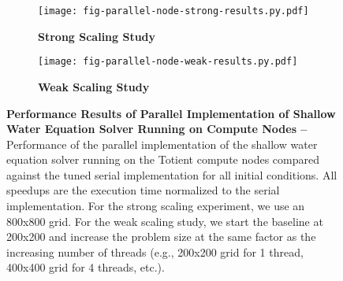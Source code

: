 
\begin{figure}[h]

  \begin{minipage}[t]{0.48\tw}
  \begin{subfigure}{\tw}

  \centering
  \texttt{[image: fig-parallel-node-strong-results.py.pdf]}
  \caption{\textbf{Strong Scaling Study}}
  \label{fig-parallel-node-strong-results}

  \end{subfigure}
  \end{minipage}%
  \hfill%
  \begin{minipage}[t]{0.48\tw}
  \begin{subfigure}{\tw}

  \centering
  \texttt{[image: fig-parallel-node-weak-results.py.pdf]}
  \caption{\textbf{Weak Scaling Study}}
  \label{fig-parallel-node-weak-results}

  \end{subfigure}
  \end{minipage}%

  \caption{\textbf{Performance Results of Parallel Implementation of
      Shallow Water Equation Solver Running on Compute Nodes --}
    Performance of the parallel implementation of the shallow water
    equation solver running on the Totient compute nodes compared against
    the tuned serial implementation for all initial conditions. All
    speedups are the execution time normalized to the serial
    implementation. For the strong scaling experiment, we use an 800x800
    grid.  For the weak scaling study, we start the baseline at 200x200
    and increase the problem size at the same factor as the increasing number
    of threads (e.g., 200x200 grid for 1 thread, 400x400 grid for 4 threads, etc.). }

  \label{fig-parallel-node-results}

\end{figure}


